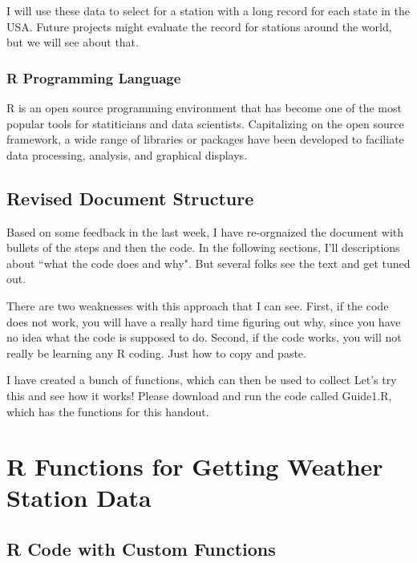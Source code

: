 \documentclass{article}\usepackage[]{graphicx}\usepackage[]{xcolor}
\begin{document}
I will use these data to select for a station with a long record for each state in the USA. Future projects might evaluate the record for stations around the world, but we will see about that. 

\subsubsection{R Programming Language}

R is an open source programming environment that has become one of the most popular tools for statiticians and data scientists. Capitalizing on the open source framework, a wide range of libraries or packages have been developed to faciliate data processing, analysis, and graphical displays. 


\subsection{Revised Document Structure}

Based on some feedback in the last week, I have re-orgnaized the document with bullets of the steps and then the code. In the following sections, I'll descriptions about ``what the code does and why". But several folks see the text and get tuned out.

There are two weaknesses with this approach that I can see. First, if the code does not work, you will have a really hard time figuring out why, since you have no idea what the code is supposed to do. Second, if the code works, you will not really be learning any R coding. Just how to copy and paste.

I have created a bunch of functions, which can then be used to collect Let's try this and see how it works! Please download and run the code called Guide1.R, which has the functions for this handout.



\section{R Functions for Getting Weather Station Data}

\subsection{R Code with Custom Functions}
\end{document}
